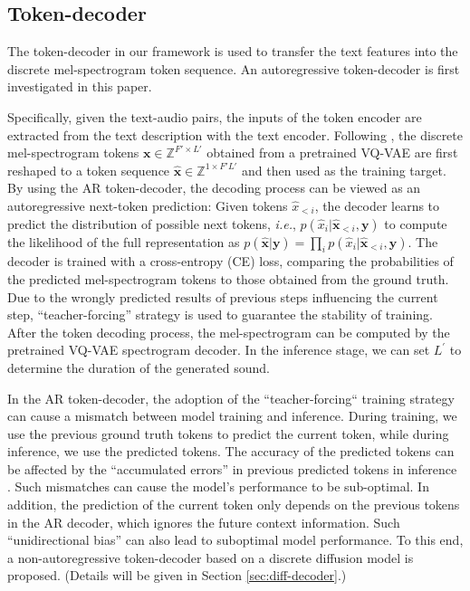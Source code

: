 \documentclass[lettersize,journal]{IEEEtran}
\begin{document}
\subsection{Token-decoder} \label{sec:autoregressive model}
The token-decoder in our framework is used to transfer the text features into the discrete mel-spectrogram token sequence. An autoregressive token-decoder is first investigated in this paper.

{\color{black}Specifically, given the text-audio pairs, the inputs of the token encoder are extracted from the text description with the text encoder.}
{\color{black} Following \cite{iashin2021taming}, the discrete mel-spectrogram tokens $\boldsymbol{x}\in\mathbb{Z}^{F'\times L'}$ obtained from a pretrained VQ-VAE are first reshaped to a token sequence $\hat{\boldsymbol{x}}\in\mathbb{Z}^{1 \times F{\prime}L{\prime}}$ and then used as the training target.}
By using the AR token-decoder, the decoding process can be viewed as an autoregressive next-token prediction: Given tokens $\hat{x}_{<i}$, the decoder learns to predict the distribution of possible next tokens, \textit{i.e.}, $p(\hat{x}_i|\hat{\boldsymbol{x}}_{<i},\boldsymbol{y})$ to compute the likelihood of the full representation as $p(\hat{\boldsymbol{x}}|\boldsymbol{y})=\prod_{i}p(\hat{x}_i|\hat{\boldsymbol{x}}_{<i},\boldsymbol{y})$. 
The decoder is trained with a cross-entropy (CE) loss, comparing  {\color{black}the probabilities of the predicted} mel-spectrogram tokens to those obtained from the ground truth. 
Due to the wrongly predicted results of previous steps influencing the current step, ``teacher-forcing'' strategy \cite{esser2021imagebart} is used to guarantee the stability of training. 
{\color{black}{The ``teacher-forcing'' strategy uses ground truth tokens as previous step prediction results.}} 
{\color{black}After the token decoding process, the mel-spectrogram can be computed by the pretrained VQ-VAE spectrogram decoder.}
{\color{black}In the inference stage, we can set $L^{\prime}$ to determine the duration of the generated sound.} 


{\color{black}In the AR token-decoder, the adoption of the ``teacher-forcing`` training strategy can cause a mismatch between model training and inference. During training, we use the previous ground truth tokens to predict the current token, while during inference, we use the predicted tokens. The accuracy of the predicted tokens can be affected by the ``accumulated errors'' in previous predicted tokens in inference \cite{schmidt2019generalization}. Such mismatches can cause the model's performance to be sub-optimal.}
{\color{black} In addition, the prediction of the current token only depends on the previous tokens in the AR decoder, which ignores the future context information. Such ``unidirectional bias'' can also lead to suboptimal model performance.}
To this end, a non-autoregressive token-decoder based on a discrete diffusion model is proposed. (Details will be given in Section \ref{sec:diff-decoder}.)
\end{document}
